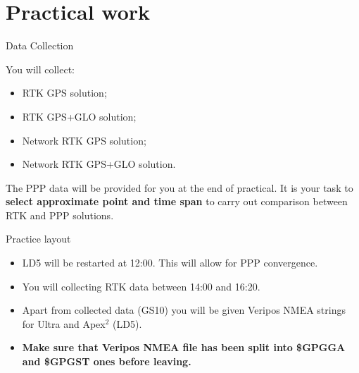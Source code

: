 \documentclass[11pt]{beamer}
\begin{document}
\section{Practical work}



\begin{frame}{Data Collection}
	
	You will  collect:
		\begin{itemize}
			\item RTK GPS solution;
			\item RTK GPS+GLO solution;
			\item Network RTK GPS solution;
			\item Network RTK GPS+GLO solution.
		\end{itemize}

	The PPP data will be provided for you at the end of practical. It is your task to \textbf{select approximate point and time span} to carry out comparison between RTK and PPP solutions. 

\end{frame}



\begin{frame}{Practice layout}
	
	\begin{itemize}
		\item LD5 will be restarted at 12:00. This will allow for PPP convergence. 
		\item You will collecting RTK data between 14:00 and 16:20. 
		\item Apart from collected data (GS10) you will be given Veripos NMEA strings for Ultra and Apex$^2$ (LD5).
		\item \textbf{Make sure that Veripos NMEA file has been split into \$GPGGA and \$GPGST ones before leaving.}
	\end{itemize}

\end{frame}
\end{document}
